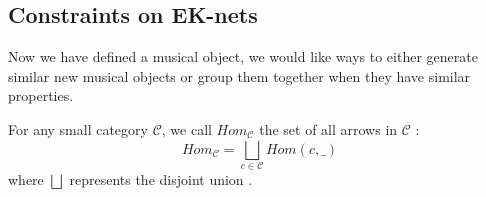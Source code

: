 






\subsection{Constraints on EK-nets}


Now we have defined a musical object, we would like ways to either generate similar new musical objects or group them together when they have similar properties.

\begin{defn}
    For any small category $\mathcal{C}$, we call $Hom_\mathcal{C}$ the set of all arrows in $\mathcal{C}$ :
    $$Hom_\mathcal{C} = \bigsqcup_{c\in\mathcal{C}}Hom(c,\_)$$
    where $\bigsqcup$ represents the disjoint union \label{nomencl:sq-cup}.
\end{defn}


